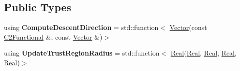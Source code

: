 \subsection*{Public Types}
\begin{DoxyCompactItemize}
\item 
\hypertarget{classSpacy_1_1Algorithm_1_1TrustRegionSolver_afc9b9694785f95d172022572d256354b}{using {\bfseries Compute\-Descent\-Direction} = std\-::function$<$ \hyperlink{classSpacy_1_1Vector}{Vector}(const \hyperlink{classSpacy_1_1C2Functional}{C2\-Functional} \&, const \hyperlink{classSpacy_1_1Vector}{Vector} \&)$>$}\label{classSpacy_1_1Algorithm_1_1TrustRegionSolver_afc9b9694785f95d172022572d256354b}

\item 
\hypertarget{classSpacy_1_1Algorithm_1_1TrustRegionSolver_a7afbbaa5d129c47186838edcf2cdf6fb}{using {\bfseries Update\-Trust\-Region\-Radius} = std\-::function$<$ \hyperlink{classSpacy_1_1Real}{Real}(\hyperlink{classSpacy_1_1Real}{Real}, \hyperlink{classSpacy_1_1Real}{Real}, \hyperlink{classSpacy_1_1Real}{Real}, \hyperlink{classSpacy_1_1Real}{Real})$>$}\label{classSpacy_1_1Algorithm_1_1TrustRegionSolver_a7afbbaa5d129c47186838edcf2cdf6fb}

\end{DoxyCompactItemize}

